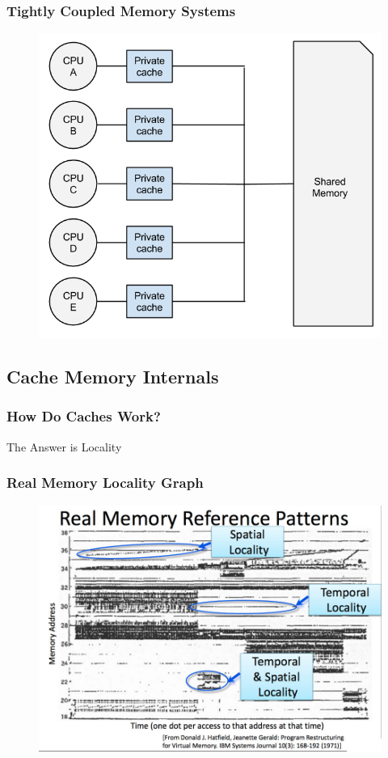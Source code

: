 \documentclass{beamer}
\begin{document}
\begin{frame}
	\frametitle{Tightly Coupled Memory Systems}
		\begin{figure}
			\includegraphics[width=0.6\linewidth]{img/tightly_coupled_memories.png}
		\end{figure}
\end{frame}


\subsection{Cache Memory Internals}
\begin{frame}
	\frametitle{How Do Caches Work?}
	\Large{\centerline{The Answer is Locality}}

\end{frame}


\begin{frame}[plain]
	\frametitle{Real Memory Locality Graph}
		\begin{figure}
			\includegraphics[width=0.9\linewidth]{img/localitygraph.jpg}
		\end{figure}
\end{frame}
\end{document}
